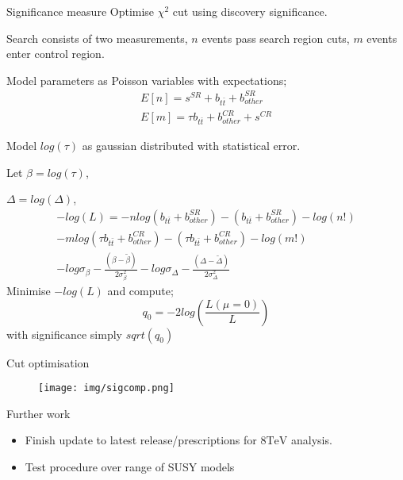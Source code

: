 \documentclass{beamer}
\begin{document}
\begin{frame}{Significance measure}
Optimise $\chi^2$ cut using discovery significance.

Search consists of two measurements, $n$ events pass search region cuts, $m$ events enter control region.

Model parameters as Poisson variables with expectations;
\begin{eqnarray}
    E[n] = s^{SR} + b_{t\bar{t}} + b_{other}^{SR} \\
    E[m] = \tau b_{t\bar{t}} + b_{other}^{CR} + s^{CR}
\end{eqnarray}

Model $log(\tau)$ as gaussian distributed with statistical error.
\end{frame}

\begin{frame}
    Let $\beta = log\left(\tau\right)$,
    
    $\Delta = log\left(\Delta\right)$,
\begin{equation}
\begin{split}
    -log(L) = -n log\left(b_{t\bar{t}} + b_{other}^{SR}\right) - \left(b_{t\bar{t}} + b_{other}^{SR}\right) - log\left(n!\right) \\
              -m log\left(\tau b_{t\bar{t}} + b_{other}^{CR}\right) - \left(\tau b_{t\bar{t}} + b_{other}^{CR}\right) - log\left(m!\right) \\
              -log \sigma_{\beta} - \frac{\left(\beta - \tilde{\beta}\right)}{2 \sigma_{\beta}^{2}}
              -log \sigma_{\Delta} - \frac{\left(\Delta - \tilde{\Delta}\right)}{2 \sigma_{\Delta}^{2}}
\end{split}
\end{equation}
Minimise $-log(L)$ and compute;
\begin{equation}
    q_0 = -2 log\left(\frac{L(\mu=0)}{L}\right)
\end{equation}
with significance simply $sqrt\left(q_0\right)$
\end{frame}

\begin{frame}{Cut optimisation}
    \begin{figure}
      \texttt{[image: img/sigcomp.png]}
    \end{figure}
\end{frame}

\begin{frame}{Further work}
  \begin{itemize}
    \item Finish update to latest release/prescriptions for $8\text{TeV}$ analysis.
    \item Test procedure over range of SUSY models
  \end{itemize}
\end{frame}
\end{document}
